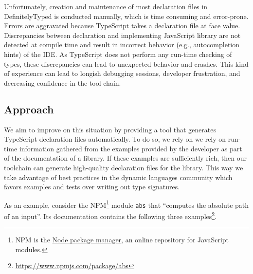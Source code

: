 \documentclass[sigplan,screen]{acmart}
\begin{document}
Unfortunately, creation and maintenance of most declaration
files in DefinitelyTyped is conducted manually,
which is time consuming and  error-prone. Errors are aggravated because TypeScript takes a
declaration file at face value. Discrepancies between declaration and
implementing JavaScript library are not detected at 
compile time and result in incorrect behavior (e.g., autocompletion
hints) of the IDE. 
As TypeScript does not perform any run-time 
checking of types, these  discrepancies can lead to unexpected 
behavior and crashes. This kind of experience can lead to longish debugging sessions,  developer
frustration, and decreasing confidence in the tool chain.

\subsection{Approach}
\label{sec:approach}

We aim to improve on this situation by providing a tool that generates
TypeScript declaration files automatically. To do so, we rely on we rely on run-time information
gathered from the examples provided
by the developer as part of the documentation of a library. If these
examples are sufficiently rich, then our toolchain can generate
high-quality declaration files for the library. This way we take
advantage of 
best practices in the dynamic languages community which favors
examples and tests over writing out type signatures.

As an example, consider the NPM\footnote{NPM is the \href{https://www.npmjs.com/}{Node package
  manager}, an online repository for JavaScript modules.} module
\texttt{abs} that
``computes the absolute path of an input''. Its documentation contains
the following three
examples\footnote{\url{https://www.npmjs.com/package/abs}}. 
\end{document}
